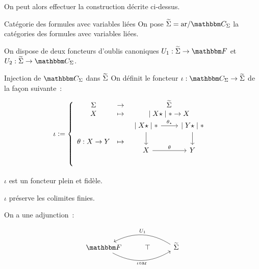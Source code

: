 On peut alors effectuer la construction décrite ci-dessus.

\begin{defi}{Catégorie des formules avec variables liées}
    On pose $\tsigma = \arf/\C_\Sigma$ la catégories des formules avec variables
    liées.

    On dispose de deux foncteurs d'oublis canoniques $U_1 : \tsigma\rightarrow\cf$
    et $U_2 : \tsigma\rightarrow\C_\Sigma$.
\end{defi}

\begin{defi}{Injection de $\C_\Sigma$ dans $\widetilde{\Sigma}$}
    On définit le foncteur $\iota:\C_\Sigma\rightarrow\tsigma$ de la façon suivante~:

    \[ \iota := \left\{\begin{array}{ccc}
        \Sigma & \rightarrow & \tsigma \\
        X      & \mapsto     & \mid X\star\mid\ast\rightarrow X \\
        \theta : X\rightarrow Y & \mapsto &
            \begin{tikzcd}
                \mid X\star\mid\ast\arrow[d]
                                   \arrow[r, "\theta_\star"]
                    & \mid Y\star\mid\ast\arrow[d] \\
                X\arrow[r, "\theta"]
                    & Y \\
            \end{tikzcd} \\
    \end{array}\right. \]
\end{defi}

\begin{lem}
    $\iota$ est un foncteur plein et fidèle.
\end{lem}

\begin{cor}
    $\iota$ préserve les colimites finies.
\end{cor}

\begin{lem}
    On a une adjunction~:

    \[\begin{tikzcd}
        \cf\arrow[rr, bend right, swap, "\iota\circ\arf"] & \top
            & \tsigma\arrow[ll, bend right, swap, "U_1"] \\
    \end{tikzcd}\]
\end{lem}

